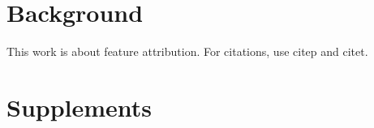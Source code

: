 
\section{Background}
This work is about feature attribution. For citations, use citep and citet. 

\section{Supplements}
\setcounter{table}{0}
\renewcommand{\thetable}{S\arabic{table}}
\setcounter{figure}{0}
\renewcommand{\thefigure}{S\arabic{figure}}

